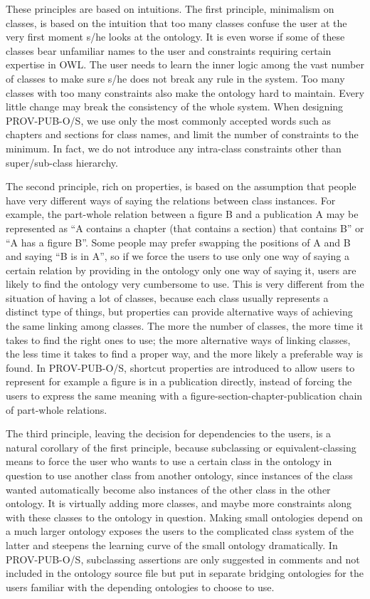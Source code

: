 These principles are based on intuitions. The first principle, minimalism on classes, is based on the intuition that too many classes confuse the user at the very first moment s/he looks at the ontology. It is even worse if some of these classes bear unfamiliar names to the user and constraints requiring certain expertise in OWL. The user needs to learn the inner logic among the vast number of classes to make sure s/he does not break any rule in the system. Too many classes with too many constraints also make the ontology hard to maintain. Every little change may break the consistency of the whole system. When designing PROV-PUB-O/S, we use only the most commonly accepted words such as chapters and sections for class names, and limit the number of constraints to the minimum. In fact, we do not introduce any intra-class constraints other than super/sub-class hierarchy.

The second principle, rich on properties, is based on the assumption that people have very different ways of saying the relations between class instances. For example, the part-whole relation between a figure B and a publication A may be represented as ``A contains a chapter (that contains a section) that contains B'' or ``A has a figure B''. Some people may prefer swapping the positions of A and B and saying ``B is in A'', so if we force the users to use only one way of saying a certain relation by providing in the ontology only one way of saying it, users are likely to find the ontology very cumbersome to use. This is very different from the situation of having a lot of classes, because each class usually represents a distinct type of things, but properties can provide alternative ways of achieving the same linking among classes. The more the number of classes, the more time it takes to find the right ones to use; the more alternative ways of linking classes, the less time it takes to find a proper way, and the more likely a preferable way is found. In PROV-PUB-O/S, shortcut properties are introduced to allow users to represent for example a figure is in a publication directly, instead of forcing the users to express the same meaning with a figure-section-chapter-publication chain of part-whole relations. 

The third principle, leaving the decision for dependencies to the users, is a natural corollary of the first principle, because subclassing or equivalent-classing means to force the user who wants to use a certain class in the ontology in question to use another class from another ontology, since instances of the class wanted automatically become also instances of the other class in the other ontology. It is virtually adding more classes, and maybe more constraints along with these classes to the ontology in question. Making small ontologies depend on a much larger ontology exposes the users to the complicated class system of the latter and steepens the learning curve of the small ontology dramatically. In PROV-PUB-O/S, subclassing assertions are only suggested in comments and not included in the ontology source file but put in separate bridging ontologies for the users familiar with the depending ontologies to choose to use.

